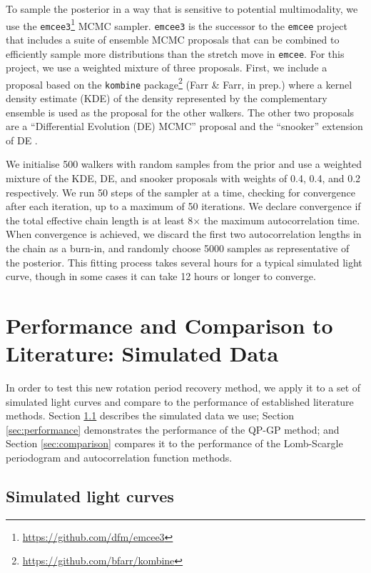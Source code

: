 \documentclass[a4paper,fleqn,usenatbib,useAMS]{mnras}
\begin{document}
To sample the posterior in a way that is sensitive to potential multimodality,
we use the \texttt{emcee3}\footnote{\url{https://github.com/dfm/emcee3}} MCMC
sampler.
\texttt{emcee3} is the successor to the \texttt{emcee} project
\citep{Foreman-Mackey2013} that includes a suite of ensemble MCMC proposals
that can be combined to efficiently sample more distributions than the stretch
move \citep{Goodman2010} in \texttt{emcee}.
For this project, we use a weighted mixture of three proposals.
First, we include a proposal based on the \texttt{kombine}
package\footnote{\url{https://github.com/bfarr/kombine}} (Farr \& Farr, in
prep.) where a kernel density estimate (KDE) of the density represented by the
complementary ensemble is used as the proposal for the other walkers.
The other two proposals are a ``Differential Evolution (DE) MCMC'' proposal
\citep{terBraak2006, Nelson2014} and the ``snooker'' extension of DE
\citep{terBraak2008}.

We initialise 500 walkers with random samples from the prior and use a
weighted mixture of the KDE, DE, and snooker proposals with weights of 0.4,
0.4, and 0.2 respectively.
We run 50 steps of the sampler at a time, checking for convergence
after each iteration, up to a maximum of 50 iterations.
We declare convergence if the total effective chain length is at least
8$\times$ the maximum autocorrelation time.
When convergence is achieved, we discard the first two autocorrelation lengths
in the chain as a burn-in, and randomly choose 5000 samples as representative
of the posterior.
This fitting process takes several hours for a typical simulated light curve,
though in some cases it can take 12 hours or longer to converge.

\section{Performance and Comparison to Literature: Simulated Data}
\label{sec:perf_and_comp}

In order to test this new rotation period recovery method, we apply it to a
set of simulated light curves and compare to the performance of established
literature methods.
Section \ref{sec:simulations} describes the simulated data we use;
Section \ref{sec:performance} demonstrates the performance of the
QP-GP method; and Section \ref{sec:comparison} compares it to the performance
of the Lomb-Scargle periodogram and autocorrelation function methods.

\subsection{Simulated light curves}
\label{sec:simulations}
\end{document}
